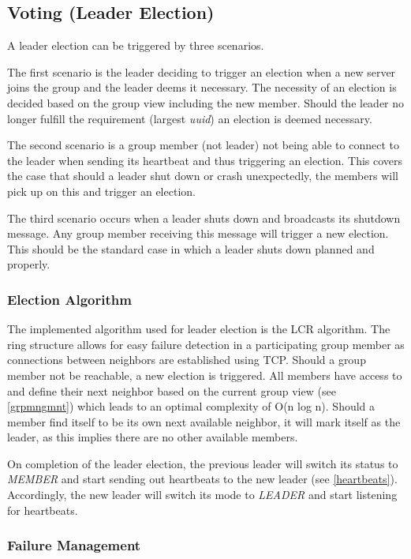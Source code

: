\documentclass[runningheads]{llncs}
\begin{document}
\subsection{Voting (Leader Election)}

A leader election can be triggered by three scenarios.

The first scenario is the leader deciding to trigger an election when a new server joins the group and the leader deems it necessary. The necessity of an election is decided based on the group view including the new member. Should the leader no longer fulfill the requirement (largest \textit{uuid}) an election is deemed necessary.

The second scenario is a group member (not leader) not being able to connect to the leader when sending its heartbeat and thus triggering an election. This covers the case that should a leader shut down or crash unexpectedly, the members will pick up on this and trigger an election.

The third scenario occurs when a leader shuts down and broadcasts its shutdown message. Any group member receiving this message will trigger a new election. This should be the standard case in which a leader shuts down planned and properly.

\subsubsection{Election Algorithm}

The implemented algorithm used for leader election is the LCR algorithm. The ring structure allows for easy failure detection in a participating group member as connections between neighbors are established using TCP. Should a group member not be reachable, a new election is triggered. All members have access to and define their next neighbor based on the current group view (see \ref{grpmngmnt}) which leads to an optimal complexity of O(n log n). Should a member find itself to be its own next available neighbor, it will mark itself as the leader, as this implies there are no other available members.

On completion of the leader election, the previous leader will switch its status to \textit{MEMBER} and start sending out heartbeats to the new leader (see \ref{heartbeats}). Accordingly, the new leader will switch its mode to \textit{LEADER} and start listening for heartbeats.

\subsubsection{Failure Management}
\end{document}
